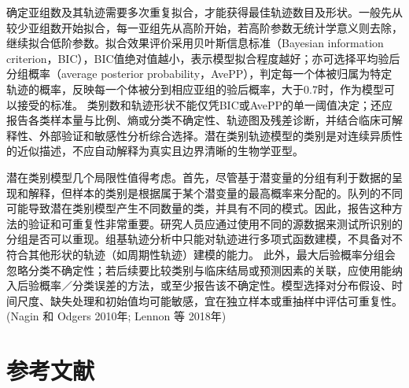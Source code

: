 \documentclass[
  chinese-hans,
  letterpaper,
  DIV=11,
  numbers=noendperiod]{scrreprt}
\begin{document}
确定亚组数及其轨迹需要多次重复拟合，才能获得最佳轨迹数目及形状。一般先从较少亚组数开始拟合，每一亚组先从高阶开始，若高阶参数无统计学意义则去除，继续拟合低阶参数。拟合效果评价采用贝叶斯信息标准（Bayesian
information
criterion，BIC），BIC值绝对值越小，表示模型拟合程度越好；亦可选择平均验后分组概率（average
posterior
probability，AvePP），判定每一个体被归属为特定轨迹的概率，反映每一个体被分到相应亚组的验后概率，大于0.7时，作为模型可以接受的标准。
类别数和轨迹形状不能仅凭BIC或AvePP的单一阈值决定；还应报告各类样本量与比例、熵或分类不确定性、轨迹图及残差诊断，并结合临床可解释性、外部验证和敏感性分析综合选择。潜在类别轨迹模型的类别是对连续异质性的近似描述，不应自动解释为真实且边界清晰的生物学亚型。

潜在类别模型几个局限性值得考虑。首先，尽管基于潜变量的分组有利于数据的呈现和解释，但样本的类别是根据属于某个潜变量的最高概率来分配的。队列的不同可能导致潜在类别模型产生不同数量的类，并具有不同的模式。因此，报告这种方法的验证和可重复性非常重要。研究人员应通过使用不同的源数据来测试所识别的分组是否可以重现。组基轨迹分析中只能对轨迹进行多项式函数建模，不具备对不符合其他形状的轨迹（如周期性轨迹）建模的能力。
此外，最大后验概率分组会忽略分类不确定性；若后续要比较类别与临床结局或预测因素的关联，应使用能纳入后验概率／分类误差的方法，或至少报告该不确定性。模型选择对分布假设、时间尺度、缺失处理和初始值均可能敏感，宜在独立样本或重抽样中评估可重复性。(Nagin
和 Odgers 2010年; Lennon 等 2018年)

\section*{参考文献}\label{ux53c2ux8003ux6587ux732e-10}

\end{document}
